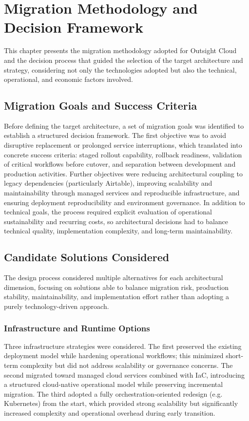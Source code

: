 \chapter{Migration Methodology and Decision Framework}
\label{chap:methodology}

This chapter presents the migration methodology adopted for Outsight Cloud and the decision process that guided the selection of the target architecture and strategy, considering not only the technologies adopted but also the technical, operational, and economic factors involved.

\section{Migration Goals and Success Criteria}
Before defining the target architecture, a set of migration goals was identified to establish a structured decision framework. The first objective was to avoid disruptive replacement or prolonged service interruptions, which translated into concrete success criteria: staged rollout capability, rollback readiness, validation of critical workflows before cutover, and separation between development and production activities. Further objectives were reducing architectural coupling to legacy dependencies (particularly Airtable), improving scalability and maintainability through managed services and reproducible infrastructure, and ensuring deployment reproducibility and environment governance. In addition to technical goals, the process required explicit evaluation of operational sustainability and recurring costs, so architectural decisions had to balance technical quality, implementation complexity, and long-term maintainability.

\section{Candidate Solutions Considered}
The design process considered multiple alternatives for each architectural dimension, focusing on solutions able to balance migration risk, production stability, maintainability, and implementation effort rather than adopting a purely technology-driven approach.

\subsection{Infrastructure and Runtime Options}
\label{sec:runtime-options}
Three infrastructure strategies were considered. The first preserved the existing deployment model while hardening operational workflows; this minimized short-term complexity but did not address scalability or governance concerns. The second migrated toward managed cloud services combined with IaC, introducing a structured cloud-native operational model while preserving incremental migration. The third adopted a fully orchestration-oriented redesign (e.g. Kubernetes) from the start, which provided strong scalability but significantly increased complexity and operational overhead during early transition.

